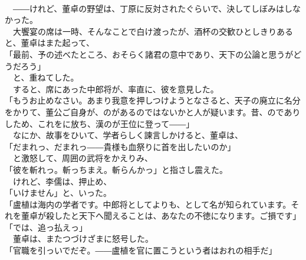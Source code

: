 \documentclass[
  paper=a5,
  fontsize=10pt,
  jafontsize=9.5pt,
  tate,                  %
  open_bracket_pos=nibu, %
]{jlreq}
\begin{document}
\\


　――けれど、董卓の野望は、丁原に反対されたぐらいで、決してしぼみはしなかった。\\


　大饗宴の席は一時、そんなことで白け渡ったが、酒杯の交歓ひとしきりあると、董卓はまた起って、\\


「最前、予の述べたところ、おそらく諸君の意中であり、天下の公論と思うがどうだろう」\\


　と、重ねてした。\\


　すると、席にあった中郎将が、率直に、彼を意見した。\\


「もうお止めなさい。あまり我意を押しつけようとなさると、天子の廃立に名分をかりて、董公ご自身が、のがあるのではないかと人が疑います。昔、のでありしため、これをに放ち、漢のが王位に登って――」\\


　なにか、故事をひいて、学者らしく諫言しかけると、董卓は、\\


「だまれっ、だまれっ――貴様も血祭りに首を出したいのか」\\


　と激怒して、周囲の武将をかえりみ、\\


「彼を斬れっ。斬っちまえ。斬らんかっ」と指さし震えた。\\


　けれど、李儒は、押止め、\\


「いけません」と、いった。\\


「盧植は海内の学者です。中郎将としてよりも、として名が知られています。それを董卓が殺したと天下へ聞えることは、あなたの不徳になります。ご損です」\\


「では、追っ払えっ」\\


　董卓は、またつづけざまに怒号した。\\


「官職を引っいでだぞ。――盧植を官に置こうという者はおれの相手だ」\\
\end{document}
